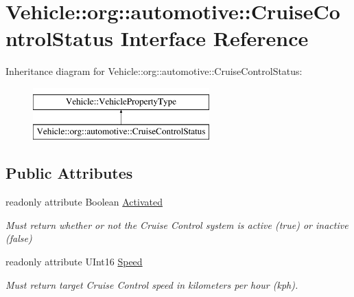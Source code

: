 \hypertarget{interfaceVehicle_1_1org_1_1automotive_1_1CruiseControlStatus}{\section{Vehicle\-:\-:org\-:\-:automotive\-:\-:Cruise\-Control\-Status Interface Reference}
\label{interfaceVehicle_1_1org_1_1automotive_1_1CruiseControlStatus}
}
Inheritance diagram for Vehicle\-:\-:org\-:\-:automotive\-:\-:Cruise\-Control\-Status\-:\begin{figure}[H]
\begin{center}
\leavevmode
\includegraphics[height=2.000000cm]{interfaceVehicle_1_1org_1_1automotive_1_1CruiseControlStatus}
\end{center}
\end{figure}
\subsection*{Public Attributes}
\begin{DoxyCompactItemize}
\item 
readonly attribute Boolean \hyperlink{interfaceVehicle_1_1org_1_1automotive_1_1CruiseControlStatus_ac09eab99f7e13e714e800d2f911075b5}{Activated}
\begin{DoxyCompactList}\small\item\em Must return whether or not the Cruise Control system is active (true) or inactive (false) \end{DoxyCompactList}\item 
readonly attribute U\-Int16 \hyperlink{interfaceVehicle_1_1org_1_1automotive_1_1CruiseControlStatus_a80ab2364136467fe957abaa155981ca2}{Speed}
\begin{DoxyCompactList}\small\item\em Must return target Cruise Control speed in kilometers per hour (kph). \end{DoxyCompactList}\end{DoxyCompactItemize}


